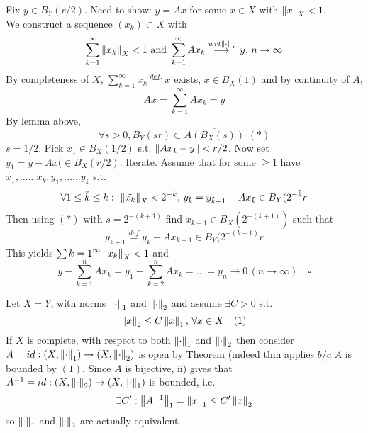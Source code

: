\begin{pf}{}{}
Fix $y\in B_Y(r/2)$. Need to show: $y=Ax$ for some $x\in X$ with $\left\|{x}\right\|_X<1.$\\
We construct a sequence $(x_k)\subset X$ with 
$$
\sum_{k=1}^\infty \left\|{x_k}\right\|_X<1\,\,\text{and}\,\,\sum_{k=1}^\infty Ax_k\stackrel{wrt\left\|{\cdot}\right\|_Y}{\longrightarrow{}}y,\,n\to\infty
$$
By completeness of $X$, $\sum_{k=1}^\infty x_k\stackrel{def.}{=}x$ exists, $x\in B_X(1)$ and by continuity of $A$,
$$Ax=\sum_{k=1}^\infty Ax_k=y$$
By lemma above, 
$$\forall s>0, B_Y(sr)\subset \overline{A(B_X(s))}\,\,(*)$$
$s=1/2$. Pick $x_1\in B_X(1/2)$ s.t. $\left\|{Ax_1-y}\right\|<r/2$. Now set $y_1=y-Ax(\in B_X(r/2)$. Iterate. Assume that for some $\geq 1$ have $x_1,......x_k,y_1,......y_k$ s.t.
$$
\forall 1\leq\tilde{k}\leq k:\,\,\left\|{\tilde{x_k}}\right\|_X<2^{-k},\,y_{\tilde{k}}=y_{\tilde{k}-1}-Ax_{\tilde{k}}\in B_Y(2^{-\tilde{k}}r
$$
Then using $(*)$ with $s=2^{-(k+1)}$ find $x_{k+1}\in B_X(2^{-(k+1)})$ such that
$$
y_{k+1}\stackrel{def}{=}y_k-Ax_{k+1}\in B_Y(2^{-(k+1)}r
$$
This yields $\sum{k=1}^{\infty}\left\|{x_k}\right\|_X<1$ and 
$$
y-\sum_{k=1}^n Ax_k=y_1-\sum_{k=2}^n Ax_k=...=y_n\to0\,(n\to \infty)\quad\square
$$
\end{pf}

\begin{example}\label{Equinorm}\nl
Let $X=Y$, with norms $\left\|{\cdot}\right\|_1$ and $\left\|{\cdot}\right\|_2$ and assume $\exists C>0$ s.t. $$\left\|{x}\right\|_2\leq C\left\|{x}\right\|_1,\,\forall x\in X\quad(1)$$
If $X$ is complete, with respect to both $\left\|{\cdot}\right\|_1$ and $\left\|{\cdot}\right\|_2$ then consider $A=id:(X,\left\|{\cdot}\right\|_1)\to(X,\left\|{\cdot}\right\|_2)$ is open by Theorem (indeed thm applies $b/c$ $A$ is bounded by $(1)$. Since $A$ is bijective, ii) gives that $A^{-1}=id:(X,\left\|{\cdot}\right\|_2)\to(X,\left\|{\cdot}\right\|_1)$ is bounded, i.e.
$$
\exists C': \left\|{A^{-1}}\right\|_1=\left\|{x}\right\|_1\leq C'\left\|{x}\right\|_2
$$
so $\left\|{\cdot}\right\|_1$ and $\left\|{\cdot}\right\|_2$ are actually equivalent.
\end{example}

